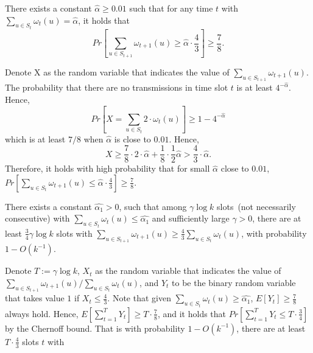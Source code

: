 \begin{lemma}
    \label{lemma10}
    There exists a constant $\hat{\alpha} \geq 0.01$ such that
    for any time $t$ with ${\sum}_{u\in S_t}\omega_t(u)=\hat{\alpha}$,
    it holds that
    \begin{equation}
        Pr[{\sum}_{u\in S_{t+1}}\omega_{t+1}(u) \geq \hat{\alpha}\cdot \frac{4}{3}] \geq \frac{7}{8}.
    \end{equation}
\end{lemma}
\begin{IEEEproof}
    Denote X as the random variable that indicates the value of 
    ${\sum}_{u\in S_{t+1}}\omega_{t+1}(u)$. The probability that 
    there are no transmissions in time slot 
    $t$ is at least $4^{-\hat{\alpha}}$. Hence,
    \begin{equation*}
        Pr[X ={\sum}_{u\in S_t}2\cdot\omega_t(u)] 
        \geq 1 - 4^{-\hat{\alpha}}
    \end{equation*}
    which is at least $7/8$ when $\hat{\alpha}$ is close to $0.01$. Hence,
    \begin{equation*}
        X \geq \frac{7}{8}\cdot 2\cdot\hat{\alpha} + 
        \frac{1}{8}\cdot \frac{1}{2}\hat{\alpha} 
        > \frac{4}{3}\cdot\hat{\alpha}.
    \end{equation*}
    Therefore, it holds with high probability that for small $\hat{\alpha}$ close to $0.01$, $Pr[{\sum}_{u\in S_t}\omega_{t+1}(u) 
    \leq \hat{\alpha}\cdot\frac{4}{3}] \geq \frac{7}{8}$.


\end{IEEEproof}


\begin{lemma}
    \label{lemma11}
    There exists a constant $\hat{\alpha_1} > 0$, such that among $\gamma\log k$ 
    slots~(not necessarily consecutive) with ${\sum}_{u\in S_t}\omega_t(u)
    \leq \hat{\alpha_1}$ and sufficiently large $\gamma > 0$, there are at 
    least $\frac{3}{4}\gamma\log k$ slots with ${\sum}_{u\in S_{t+1}}\omega_{t+1}(u)
    \geq \frac{4}{3}{\sum}_{u\in S_t}\omega_t(u)$, with probability $1 - O(k^{-1})$.
\end{lemma}
\begin{IEEEproof}
    Denote $T := \gamma\log k$, $X_t$ as the random variable that indicates the value of 
    ${\sum}_{u\in S_{t+1}}\omega_{t+1}(u) / {\sum}_{u\in S_t}\omega_t(u)$, and 
    $Y_t$ to be the binary random variable that takes value $1$ if $X_t \leq \frac{4}{3}$.
    Note that given ${\sum}_{u\in S_t}\omega_t(u) \geq \hat{\alpha_1}$, $E[Y_t] \geq \frac{7}{8}$
    always hold. Hence, $E[\sum_{t=1}^{T}Y_t] \geq T\cdot\frac{7}{8}$, and it holds that
    $Pr[\sum_{t=1}^{T}Y_t\leq T\cdot\frac{3}{4}]$ by the Chernoff bound. That is with probability 
    $1-O(k^{-1})$, there are at least $T\cdot\frac{4}{3}$ slots $t$ with  
\end{IEEEproof}


